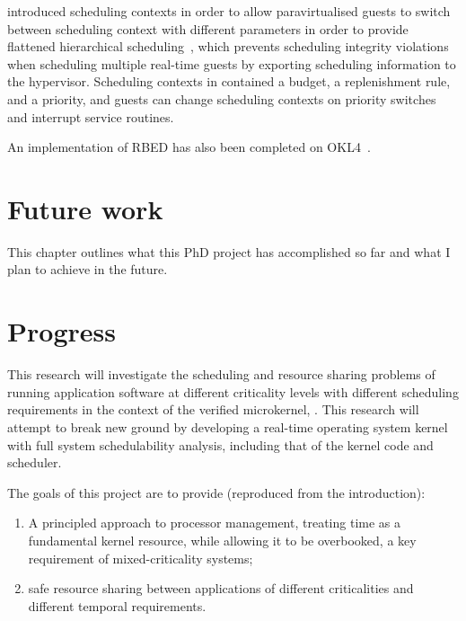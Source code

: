 \fiascooc introduced scheduling contexts in order to allow paravirtualised guests to switch between
scheduling context with different parameters in order to provide flattened hierarchical
scheduling~\citep{Lackorzynski_WVH_12}, which prevents scheduling integrity violations
when scheduling multiple real-time guests by exporting scheduling information to the hypervisor.
Scheduling contexts in \fiascooc contained a budget, a
replenishment rule, and a priority, and guests 
can change scheduling contexts on priority switches and interrupt service routines.

An implementation of RBED has also been completed on OKL4~\citep{Petters_LHE_09}.

\section{Future work}



This chapter outlines what this PhD project has accomplished so far and what I plan to achieve in the future.

\section{Progress}

This research will investigate the scheduling and resource sharing problems of running application software at different criticality levels with different scheduling requirements in the context of the verified microkernel, \selfour.
This research will attempt to break new ground by developing a real-time operating system kernel with full system schedulability analysis, including that of the kernel code and scheduler.

The goals of this project are to provide (reproduced from the introduction):

\begin{enumerate}[label=\textbf{G\arabic*}]
  \item \label{G1} A principled approach to processor management, treating time as a fundamental kernel resource, while allowing it to be overbooked, a key requirement of mixed-criticality systems;
  \item \label{G2} safe resource sharing between applications of different criticalities and different temporal requirements.
\end{enumerate}

